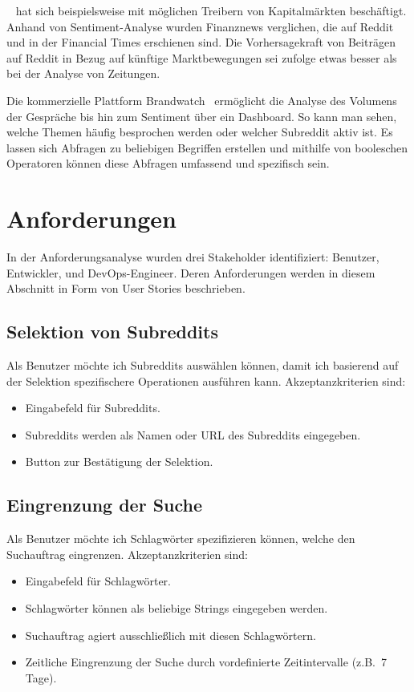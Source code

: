 \documentclass[a4paper, 10pt, conference]{IEEEtran}
\begin{document}
\citeauthor{lubitz2017}~\cite{lubitz2017} hat sich beispielsweise mit möglichen Treibern von Kapitalmärkten beschäftigt. Anhand von Sentiment-Analyse wurden Finanznews verglichen, die auf Reddit und in der Financial Times erschienen sind. Die Vorhersagekraft von Beiträgen auf Reddit in Bezug auf künftige Marktbewegungen sei \citeauthor{lubitz2017} zufolge etwas besser als bei der Analyse von Zeitungen.

Die kommerzielle Plattform Brandwatch~\cite{brandwatch} ermöglicht die Analyse des Volumens der Gespräche bis hin zum Sentiment über ein Dashboard. So kann man sehen, welche Themen häufig besprochen werden oder welcher Subreddit aktiv ist. Es lassen sich Abfragen zu beliebigen Begriffen erstellen und mithilfe von booleschen Operatoren können diese Abfragen umfassend und spezifisch sein.


\section{Anforderungen} \label{s:anforderungen}

In der Anforderungsanalyse wurden drei Stakeholder identifiziert: Benutzer, Entwickler, und DevOps-Engineer. Deren Anforderungen werden in diesem Abschnitt in Form von User Stories beschrieben.

\subsection{Selektion von Subreddits}

Als Benutzer möchte ich Subreddits auswählen können, damit ich basierend auf der Selektion spezifischere Operationen ausführen kann. Akzeptanzkriterien sind:
\begin{itemize}
\item Eingabefeld für Subreddits.
\item Subreddits werden als Namen oder URL des Subreddits eingegeben.
\item Button zur Bestätigung der Selektion.
\end{itemize}

\subsection{Eingrenzung der Suche}

Als Benutzer möchte ich Schlagwörter spezifizieren können, welche den Suchauftrag eingrenzen. Akzeptanzkriterien sind:
\begin{itemize}
\item Eingabefeld für Schlagwörter.
\item Schlagwörter können als beliebige Strings eingegeben werden.
\item Suchauftrag agiert ausschließlich mit diesen Schlagwörtern.
\item Zeitliche Eingrenzung der Suche durch vordefinierte Zeitintervalle (z.B.~7 Tage).
\end{itemize}
\end{document}

